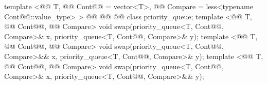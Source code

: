 \documentclass[american,twoside]{book}
\begin{document}
\begin{codeblock}
{  template <@@ T, @@ Cont@@ = vector<T>,
        @@ Compare = less<typename Cont@@::value_type> >
    @@
          @@
          @@
  class priority_queue;
  template <@@ T, @@ Cont@@, @@ Compare>
    void swap(priority_queue<T, Cont@@, Compare>& x, priority_queue<T, Cont@@, Compare>& y);
  template <@@ T, @@ Cont@@, @@ Compare>
    void swap(priority_queue<T, Cont@@, Compare>&& x, priority_queue<T, Cont@@, Compare>& y);
  template <@@ T, @@ Cont@@, @@ Compare>
    void swap(priority_queue<T, Cont@@, Compare>& x, priority_queue<T, Cont@@, Compare>&& y);
}
\end{codeblock}

%
\end{document}
